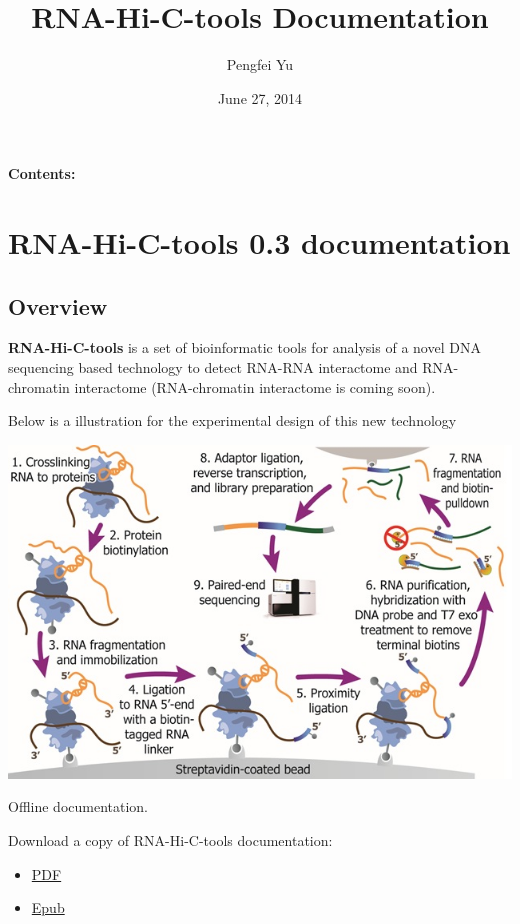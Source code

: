 \documentclass[letterpaper,10pt,english]{sphinxmanual}
\title{RNA-Hi-C-tools Documentation}
\date{June 27, 2014}
\author{Pengfei Yu}
\begin{document}
\maketitle
\tableofcontents
{}\label{index::doc}


\textbf{Contents:}


\chapter{RNA-Hi-C-tools 0.3 documentation}
\label{RNA-Hi-C-tools:welcome-to-rna-hi-c-tools-s-documentation}\label{RNA-Hi-C-tools::doc}\label{RNA-Hi-C-tools:rna-hi-c-tools-version-documentation}

\section{Overview}
\label{RNA-Hi-C-tools:overview}
\textbf{RNA-Hi-C-tools} is a set of bioinformatic tools for analysis of a novel DNA sequencing based technology to detect RNA-RNA interactome and RNA-chromatin interactome (RNA-chromatin interactome is coming soon).

Below is a illustration for the experimental design of this new technology

{\hfill\includegraphics{exp.jpg}\hfill}




Offline documentation.

Download a copy of RNA-Hi-C-tools documentation:
\begin{itemize}
\item {} 
\href{http://systemsbio.ucsd.edu/RNA-Hi-C/\_sources/Stitch-seq-tools.pdf}{PDF}

\item {} 
\href{https://media.readthedocs.org/epub/stitch-seq-tools/latest/stitch-seq-tools.epub}{Epub}

\end{itemize}
\end{document}
